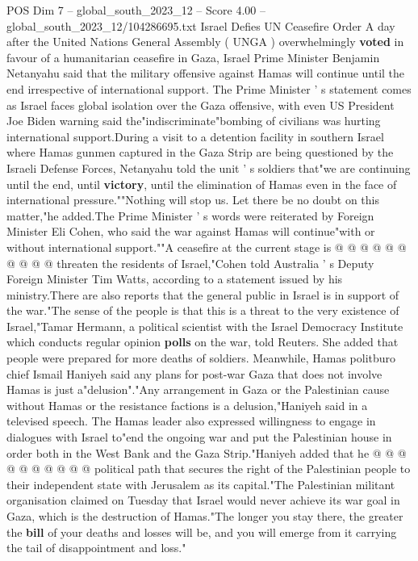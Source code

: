 \begin{textsample}{POS Dim 7 – global\_south\_2023\_12 – Score 4.00 – global\_south\_2023\_12/104286695.txt}  \label{ex:f7_pos_265}
Israel Defies UN Ceasefire Order A day after the United Nations General Assembly ( UNGA ) overwhelmingly \textbf{voted} in favour of a humanitarian ceasefire in Gaza, Israel Prime Minister Benjamin Netanyahu said that the military offensive against Hamas will continue until the end irrespective of international support.
The Prime Minister ' s statement comes as Israel faces global isolation over the Gaza offensive, with even US President Joe Biden warning said the"indiscriminate"bombing of civilians was hurting international support.During a visit to a detention facility in southern Israel where Hamas gunmen captured in the Gaza Strip are being questioned by the Israeli Defense Forces, Netanyahu told the unit ' s soldiers that"we are continuing until the end, until \textbf{victory}, until the elimination of Hamas even in the face of international pressure.""Nothing will stop us.
Let there be no doubt on this matter,"he added.The Prime Minister ' s words were reiterated by Foreign Minister Eli Cohen, who said the war against Hamas will continue"with or without international support.""A ceasefire at the current stage is @ @ @ @ @ @ @ @ @ @ threaten the residents of Israel,"Cohen told Australia ' s Deputy Foreign Minister Tim Watts, according to a statement issued by his ministry.There are also reports that the general public in Israel is in support of the war."The sense of the people is that this is a threat to the very existence of Israel,"Tamar Hermann, a political scientist with the Israel Democracy Institute which conducts regular opinion \textbf{polls} on the war, told Reuters.
She added that people were prepared for more deaths of soldiers.
Meanwhile, Hamas politburo chief Ismail Haniyeh said any plans for post-war Gaza that does not involve Hamas is just a"delusion"."Any arrangement in Gaza or the Palestinian cause without Hamas or the resistance factions is a delusion,"Haniyeh said in a televised speech.
The Hamas leader also expressed willingness to engage in dialogues with Israel to"end the ongoing war and put the Palestinian house in order both in the West Bank and the Gaza Strip."Haniyeh added that he @ @ @ @ @ @ @ @ @ @ political path that secures the right of the Palestinian people to their independent state with Jerusalem as its capital."The Palestinian militant organisation claimed on Tuesday that Israel would never achieve its war goal in Gaza, which is the destruction of Hamas."The longer you stay there, the greater the \textbf{bill} of your deaths and losses will be, and you will emerge from it carrying the tail of disappointment and loss."

\end{textsample}
